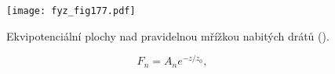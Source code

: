   \begin{figure}[ht!]  %
    \centering
    \texttt{[image: fyz\_fig177.pdf]}
    \caption{Ekvipotenciální plochy nad pravidelnou mřížkou nabitých drátů
             (\cite[s.~136]{Feynman02}).}
    \label{fyz:fig177}
  \end{figure}

  \begin{equation}\label{fyz:eq800} 
    F_n=A_ne^{−z/z_0},
  \end{equation}

